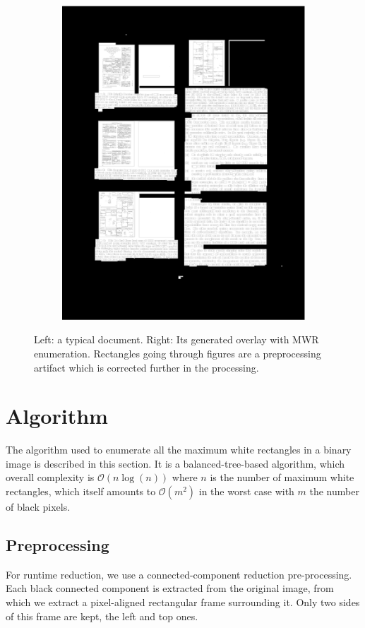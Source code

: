 \documentclass{report}
\begin{document}
\begin{figure}
\begin{subfigure}{0.47\textwidth}
\includegraphics[width = \textwidth]{overlay1.png}
\end{subfigure}
\caption{Left: a typical document. Right: Its generated overlay with MWR enumeration. Rectangles going through figures are a preprocessing
artifact which is corrected further in the processing.}
\label{MWRoverlayEx}
\end{figure}

\section{Algorithm}
The algorithm used to enumerate all the maximum white rectangles in a binary image is described in this section. It is a balanced-tree-based
algorithm, which overall complexity is $\mathcal{O}(n\log(n))$ where $n$ is the number of maximum white rectangles, which itself
amounts to $\mathcal{O}(m^2)$ in the worst case with $m$ the number of black pixels.\\

\subsection{Preprocessing}
For runtime reduction, we use a connected-component reduction pre-processing. Each black connected component is extracted from the original
image, from which we extract a pixel-aligned rectangular frame surrounding it. Only two sides of this frame are kept, the left and top ones.\\
\end{document}
